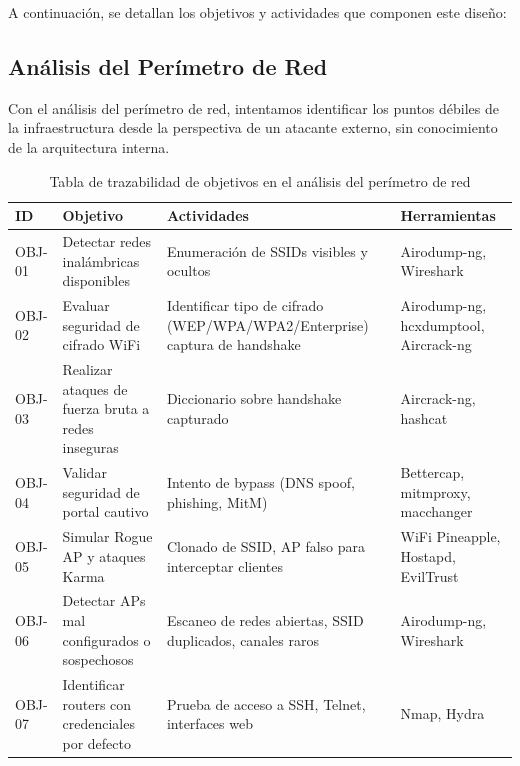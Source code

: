\documentclass[a4paper, 10pt]{article}
\begin{document}
A continuación, se detallan los objetivos y actividades que componen este diseño:



\subsection{Análisis del Perímetro de Red}

Con el análisis del perímetro de red, intentamos identificar los puntos débiles de la infraestructura desde la perspectiva de un atacante externo, sin conocimiento de la arquitectura interna.

\begin{table}[H]
    \centering
    \renewcommand{\arraystretch}{1.4}
    \begin{tabular}{|p{1.2cm}|p{3.9cm}|p{5.3cm}|p{4.2cm}|}
    \hline
    \textbf{ID} & \textbf{Objetivo} & \textbf{Actividades} & \textbf{Herramientas}\\
    \hline
    OBJ-01 & Detectar redes inalámbricas disponibles & Enumeración de SSIDs visibles y ocultos & Airodump-ng, Wireshark\\
    \hline
    OBJ-02 & Evaluar seguridad de cifrado WiFi & Identificar tipo de cifrado (WEP/WPA/WPA2/Enterprise) captura de handshake & Airodump-ng, hcxdumptool, Aircrack-ng \\
    \hline
    OBJ-03 & Realizar ataques de fuerza bruta a redes inseguras & Diccionario sobre handshake capturado & Aircrack-ng, hashcat \\
    \hline
    OBJ-04 & Validar seguridad de portal cautivo & Intento de bypass (DNS spoof, phishing, MitM) & Bettercap, mitmproxy, macchanger\\
    \hline
    OBJ-05 & Simular Rogue AP y ataques Karma & Clonado de SSID, AP falso para interceptar clientes & WiFi Pineapple, Hostapd, EvilTrust \\
    \hline
    OBJ-06 & Detectar APs mal configurados o sospechosos & Escaneo de redes abiertas, SSID duplicados, canales raros & Airodump-ng, Wireshark\\
    \hline
    OBJ-07 & Identificar routers con credenciales por defecto & Prueba de acceso a SSH, Telnet, interfaces web & Nmap, Hydra \\
    \hline
    \end{tabular}
    \caption{Tabla de trazabilidad de objetivos en el análisis del perímetro de red}
    \end{table}
    
\end{document}
